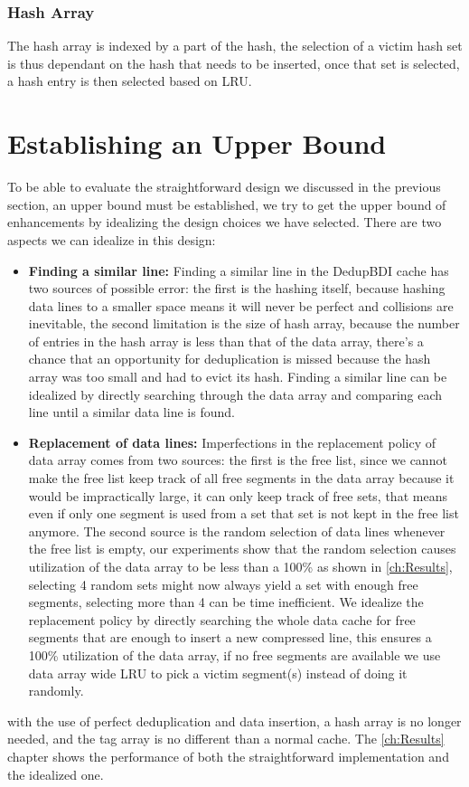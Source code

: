 \subsubsection{Hash Array}
\label{sssec:DedupBDIHash}
The hash array is indexed by a part of the hash, the selection of a victim hash set is thus dependant on the hash that needs to be inserted, once that set is selected, a hash entry is then selected based on LRU.

\section{Establishing an Upper Bound}
\label{sec:Upper Bound}
To be able to evaluate the straightforward design we discussed in the previous section, an upper bound must be established, we try to get the upper bound of enhancements by idealizing the design choices we have selected. There are two aspects we can idealize in this design:
\begin{itemize}
    \item \textbf{Finding a similar line:} Finding a similar line in the DedupBDI cache has two sources of possible error: the first is the hashing itself, because hashing data lines to a smaller space means it will never be perfect and collisions are inevitable, the second limitation is the size of hash array, because the number of entries in the hash array is less than that of the data array, there's a chance that an opportunity for deduplication is missed because the hash array was too small and had to evict its hash. Finding a similar line can be idealized by directly searching through the data array and comparing each line until a similar data line is found.
    \item \textbf{Replacement of data lines:} Imperfections in the replacement policy of data array comes from two sources: the first is the free list, since we cannot make the free list keep track of all free segments in the data array because it would be impractically large, it can only keep track of free sets, that means even if only one segment is used from a set that set is not kept in the free list anymore. The second source is the random selection of data lines whenever the free list is empty, our experiments show that the random selection causes utilization of the data array to be less than a 100\% as shown in \ref{ch:Results}, selecting 4 random sets might now always yield a set with enough free segments, selecting more than 4 can be time inefficient. We idealize the replacement policy by directly searching the whole data cache for free segments that are enough to insert a new compressed line, this ensures a 100\% utilization of the data array, if no free segments are available we use data array wide LRU to pick a victim segment(s) instead of doing it randomly.
\end{itemize}
with the use of perfect deduplication and data insertion, a hash array is no longer needed, and the tag array is no different than a normal cache. The \ref{ch:Results} chapter shows the performance of both the straightforward implementation and the idealized one.

